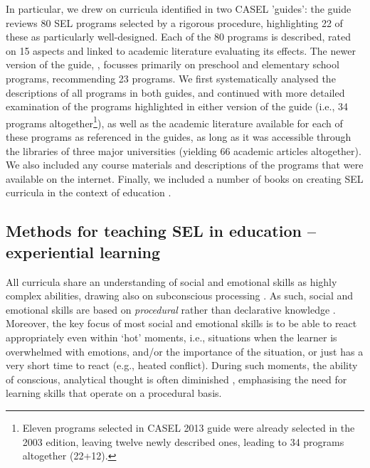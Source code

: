 \documentclass[prodmode,acmtochi]{acmsmall}
\newcommand{\GeraldineTODO}[1]{}
\begin{document}
In particular, we drew on curricula identified in two CASEL 'guides': the  guide reviews 80 SEL programs selected by a rigorous procedure, highlighting 22 of
 these as particularly well-designed. Each of the 80 programs is described, rated on 15 aspects and linked to academic literature evaluating its effects. The newer version of the guide, , focusses primarily on preschool and elementary school programs, recommending 23 programs.
%
We first systematically analysed the descriptions of all programs in both guides, and continued with more detailed examination of the programs highlighted in either version of the guide (i.e., 34 programs altogether\footnote{Eleven programs selected in CASEL 2013 guide were already selected in the 2003 edition, leaving twelve newly described ones, leading to 34 programs altogether (22+12). \GeraldineTODO{LIST\ THESE\ BY\ NAME\ HERE\ AS\ COMPLETE\ LIST?}}), as well as the academic literature available for each of these programs as referenced in the guides, as long as it was accessible through the libraries of three major universities (yielding 66 academic articles altogether). We also included any course materials and descriptions of the programs that were available on the internet. Finally, we included a number of books on creating SEL curricula in the context of education \cite{Maree2007,Elias1997,Pasi2001,Zins2004,Patrikakou2005}. 








\subsection{Methods for teaching SEL in education -- experiential learning}
\label{sec:methods}

All curricula share an understanding of social and emotional skills as highly complex abilities, drawing also on subconscious processing \cite{Ambady2010,Lieberman2000}. As such, social and emotional skills are based on \emph{procedural} rather than declarative knowledge \cite[p.288]{kruglanski2007social}. Moreover, the key focus of most social and emotional skills is to be able to react appropriately even within `hot' moments, i.e., situations  when the learner is overwhelmed with emotions, and/or the importance of the situation, or just has a very short time to react (e.g., heated conflict). During such moments, the ability of conscious, analytical thought is often diminished \cite{Wyman2010,leDoux1998}, emphasising the need for learning skills that operate on a procedural basis.
\end{document}
